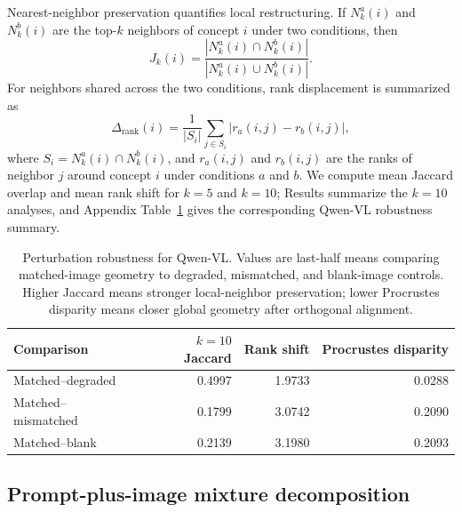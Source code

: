\documentclass{article}
\begin{document}
Nearest-neighbor preservation quantifies local restructuring. If \(N_k^a(i)\) and \(N_k^b(i)\) are the top-\(k\) neighbors of concept \(i\) under two conditions, then
\begin{equation}
  J_k(i)=\frac{|N_k^a(i)\cap N_k^b(i)|}{|N_k^a(i)\cup N_k^b(i)|}.
  \label{eq:appendix_jaccard}
\end{equation}
For neighbors shared across the two conditions, rank displacement is summarized as
\begin{equation}
  \Delta_{\mathrm{rank}}(i)=\frac{1}{|S_i|}\sum_{j\in S_i}\left|r_a(i,j)-r_b(i,j)\right|,
  \label{eq:appendix_rank_shift}
\end{equation}
where \(S_i=N_k^a(i)\cap N_k^b(i)\), and \(r_a(i,j)\) and \(r_b(i,j)\) are the ranks of neighbor \(j\) around concept \(i\) under conditions \(a\) and \(b\). We compute mean Jaccard overlap and mean rank shift for \(k=5\) and \(k=10\); Results summarize the \(k=10\) analyses, and Appendix Table~\ref{tab:appendix_perturbation_robustness} gives the corresponding Qwen-VL robustness summary.

\begin{table}[!htbp]
\centering
\caption{Perturbation robustness for Qwen-VL. Values are last-half means comparing matched-image geometry to degraded, mismatched, and blank-image controls. Higher Jaccard means stronger local-neighbor preservation; lower Procrustes disparity means closer global geometry after orthogonal alignment.}
\label{tab:appendix_perturbation_robustness}
\footnotesize
\begin{tabular}{lrrr}
\toprule
Comparison & \(k=10\) Jaccard & Rank shift & Procrustes disparity \\
\midrule
Matched--degraded & 0.4997 & 1.9733 & 0.0288 \\
Matched--mismatched & 0.1799 & 3.0742 & 0.2090 \\
Matched--blank & 0.2139 & 3.1980 & 0.2093 \\
\bottomrule
\end{tabular}
\end{table}

\subsection{Prompt-plus-image mixture decomposition}
\end{document}
